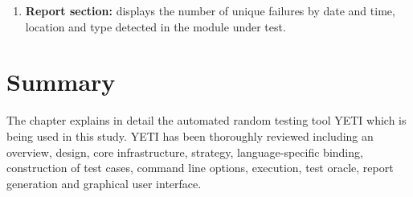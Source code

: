 \begin{enumerate}
\item \textbf{Report section:} displays the number of unique failures by date and time, location and type detected in the module under test. 
\end{enumerate}


\section{Summary}
The chapter explains in detail the automated random testing tool YETI which is being used in this study. YETI has been thoroughly reviewed including an overview, design, core infrastructure, strategy, language-specific binding, construction of test cases, command line options, execution, test oracle, report generation and graphical user interface.


